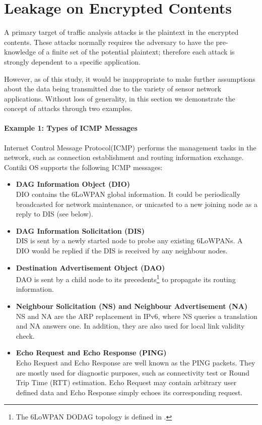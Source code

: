 \section{Leakage on Encrypted Contents}

A primary target of traffic analysis attacks is the plaintext in the encrypted contents. These attacks normally requires the adversary to have the pre-knowledge of a finite set of the potential plaintext; therefore each attack is strongly dependent to a specific application.

However, as of this study, it would be inappropriate to make further assumptions about the data being transmitted due to the variety of sensor network applications. Without loss of generality, in this section we demonstrate the concept of attacks through two examples.

\paragraph{Example 1: Types of ICMP Messages}

Internet Control Message Protocol(ICMP)\cite{rfc4443} performs the management tasks in the network, such as connection establishment and routing information exchange. Contiki OS supports the following ICMP messages:

\begin{itemize}
	\item \textbf{DAG Information Object (DIO)} \\
	DIO contains the 6LoWPAN global information. It could be periodically broadcasted for network maintenance, or unicasted to a new joining node as a reply to DIS (see below).
	\item \textbf{DAG Information Solicitation (DIS)} \\
	DIS is sent by a newly started node to probe any existing 6LoWPANs. A DIO would be replied if the DIS is received by any neighbour nodes.
	\item \textbf{Destination Advertisement Object (DAO)} \\
	DAO is sent by a child node to its precedents\footnote{The 6LoWPAN DODAG topology is defined in \cite{rfc6550}.} to propagate its routing information.
	\item \textbf{Neighbour Solicitation (NS) and Neighbour Advertisement (NA)} \\
	NS and NA are the ARP replacement in IPv6, where NS queries a translation and NA answers one. In addition, they are also used for local link validity check.
	\item \textbf{Echo Request and Echo Response (PING)} \\
	Echo Request and Echo Response are well known as the PING packets. They are mostly used for diagnostic purposes, such as connectivity test or Round Trip Time (RTT) estimation. Echo Request may contain arbitrary user defined data and Echo Response simply echoes its corresponding request.
\end{itemize}

